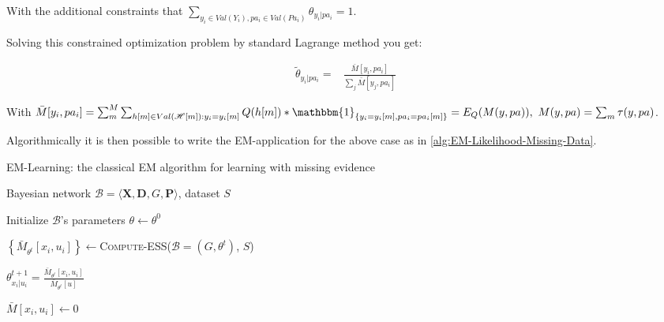 \documentclass[11pt]{article}
\begin{document}
\begin{article}
With the additional constraints that \(\sum_{y_i \in Val(Y_i), pa_i
     \in Val(Pa_i)} \theta_{y_i | pa_i} = 1\).

Solving this constrained optimization problem by standard
Lagrange method you get: 

\begin{align} \label{eq:solution}
\tilde{\theta}_{y_i | pa_i} =& \frac{\bar{M}[y_i, pa_i]}{\sum_j \bar{M}[y_j, pa_i]}
\end{align}

With \(\bar{M}[y_i, pa_i] = \sum_m^M \sum_{h[m] \in
     Val(\mathscr{H}[m]): y_i = y_i[m]} Q(h[m]) * \mathbbm{1}_{\{y_i = y_i[m], pa_i =
     pa_i[m]\}} = E_Q(M(y, pa)), \ M(y, pa) = \sum_m \tau(y,pa)\).

Algorithmically it is then possible to write the EM-application for
the above case as in \ref{alg:EM-Likelihood-Missing-Data}.

\algrenewcommand\algorithmicindent{1.5em}%

\begin{algorithm*}[h!]
\caption{EM-Learning: the classical EM algorithm for learning with missing evidence}
\label{alg:EM-Likelihood-Missing-Data}
\vspace{-10pt}
\begin{multicols}{2}
\begin{algorithmic}[1] 
\Require Bayesian network $\mathcal{B}=\langle \mathbf{X},\mathbf{D}, G, \mathbf{P} \rangle$, dataset $S$ 

\State Initialize $\mathcal{B}$'s parameters $\theta \leftarrow \theta^0$

  \State $\left\{ \bar{M}_{\theta^t}[x_{i},u_{i}]\right\} \leftarrow$\textsc{Compute-ESS}($\mathcal{B}=(G,\theta^{t})$, $S$)



      \State $\theta_{x_{i}|u_{i}}^{t+1}=\frac{\bar{M}_{\theta^{t}}[x_{i},u_{i}]}{\bar{M}_{\theta^{t}}[u]}$
    \EndFor
  \EndFor
\EndFor
\EndProcedure
\\

   \State $\bar{M}[x_{i},u_{i}]\leftarrow 0$
  \EndFor
\EndFor


\end{algorithmic}
\end{multicols}
\end{algorithm*}
\end{article}
\end{document}
